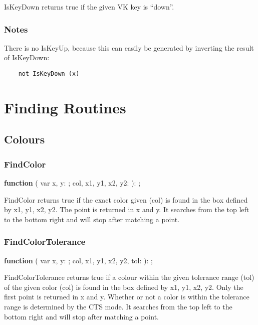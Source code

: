 \documentclass[a4paper]{report}
\begin{document}
IsKeyDown returns true if the given VK key is ``down''.

\subsection{Notes}

There is no IsKeyUp, because this can easily be generated by inverting the
result of IsKeyDown:
\begin{verbatim}
    not IsKeyDown (x)
\end{verbatim}


\chapter{Finding Routines}

\section{Colours}

\subsection{FindColor}

\textbf{function} {\color{blue}{FindColor}}({\color{typeRed}
{var x, y: }}{\color{typeGreen}{Integer}}; {\color{typeRed}
{col, x1, y1, x2, y2: }}{\color{typeGreen}{Integer}}): {\color{typeGreen}{Boolean}};

FindColor returns true if the exact color given (col) is found in the box defined by x1, y1, x2, y2.
The point is returned in x and y. It searches from the top left to the bottom right and will stop
after matching a point.

\subsection{FindColorTolerance}

\textbf{function} {\color{blue}{FindColorTolerance}}({\color{typeRed}
{var x, y: }}{\color{typeGreen}{Integer}}; {\color{typeRed}
{col, x1, y1, x2, y2, tol: }}{\color{typeGreen}{Integer}}): {\color{typeGreen}{Boolean}};

FindColorTolerance returns true if a colour within the given tolerance range (tol) of the given color (col)
is found in the box defined by x1, y1, x2, y2. Only the first point is returned in x and y.
Whether or not a color is within the tolerance range is determined by the CTS mode.
It searches from the top left to the bottom right and will stop after matching a point.
\end{document}
